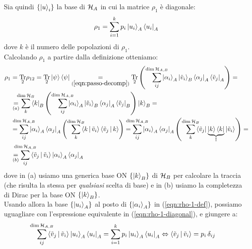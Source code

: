 \documentclass[../../InformazioneQuantistica.tex]{subfiles}
\begin{document}
Sia quindi $\{\Ket{u}_i\}$ la base di $\mathcal{H}_A$ in cui la matrice $\rho_1$ è diagonale:
\begin{align}
\rho_1 = \sum_{i=1}^{k} p_i\Ket{u_i}_A \Bra{u_i}_A
\label{eqn:rho-1-diagonal}
\end{align}
dove $k$ è il numero delle popolazioni di $\rho_1$.\\
Calcolando $\rho_1$ a partire dalla definizione otteniamo:
\begin{align} \nonumber
\rho_1 &= \underset{2}{\op{Tr}}\rho_{12} =\underset{2}{\op{Tr}}\ket{\psi}\bra{\psi} \underset{(\ref{eqn:passo-decomp})}{=} \underset{2}{\op{Tr}} \left(\smashoperator[r]{\sum_{ij}^{\op{dim}\hs_{A,B}}}\ket{\alpha_i}_A\ket{\tilde{v}_i}_B \bra{\alpha_j}_A\bra{\tilde{v}_j}_A \right) =\\ \nonumber
&\underset{(a)}{=} \smashoperator{\sum_k^{\op{dim}\hs_B}} \bra{k}_B \left( \smashoperator[r]{\sum_{ij}^{\op{dim}\hs_{A,B}}} \ket{\alpha_i}_A\ket{\tilde{v}_i}_B \bra{\alpha_j}_A \bra{\tilde{v}_j}_B \right)\ket{k}_B =\\
&= \nonumber \smashoperator{\sum_{ij}^{\op{dim}\hs_{A,B}}} \ket{\alpha_i}_A\bra{\alpha_j}_A \left(\smashoperator[r]{\sum_k^{\op{dim}\hs_B}} \braket{k|\tilde{v}_i} \braket{\tilde{v}_j|k}\right) =
 \smashoperator{\sum_{ij}^{\op{dim}\hs_{A,B}}} \ket{\alpha_i}_A\bra{\alpha_j}_A \left(\smashoperator[r]{\sum_k^{\op{dim}\hs_B}} \bra{\tilde{v}_j}\underbrace{\ket{k}\bra{k}}_{\bb{I}}\ket{\tilde{v}_i}\right) =\\
&\underset{(b)}{=} \smashoperator{\sum_{ij}^{\op{dim}\hs_{A,B}}} \braket{\tilde{v}_j|\tilde{v}_i} \ket{\alpha_i}_A \bra{\alpha_j}_A
\label{eqn:rho-1-def}
\end{align}
dove in (a) usiamo una generica base ON $\{\Ket{k}_B\}$ di $\mathcal{H}_B$ per calcolare la traccia (che risulta la stessa per \textit{qualsiasi} scelta di base) e in (b) usiamo la completezza di Dirac per la base ON $\{\Ket{k}_B\}$.\\
Usando allora la base $\{\Ket{u_i}_A\}$ al posto di $\{\Ket{\alpha_i}_A\}$ in (\ref{eqn:rho-1-def}), possiamo uguagliare con l'espressione equivalente in (\ref{eqn:rho-1-diagonal}), e giungere a:
\begin{align*}
\smashoperator{\sum_{ij}^{\op{dim}\hs_{A,B}}} \braket{\tilde{v}_j|\tilde{v}_i}\ket{u_i}_A \bra{u_i}_A = \sum_{i=1}^k p_i \ket{u_i}_A \bra{u_i}_A \Leftrightarrow \braket{\tilde{v}_j|\tilde{v}_i}=p_i\,\delta_{ij}
\end{align*}

\begin{comment}
\begin{align}
\ket{\psi}=\sum_{i, \alpha} c_{i\alpha}\ket{i}_A\ket{\alpha}_B = \sum_{i} \ket{i}_A \left(\sum_\alpha c_{i\alpha} \ket{\alpha}_B \right)\underset{(a)}{=} \sum_{i}\ket{i}_A \ket{\tilde{i}}_B
\label{eqn:psi-i-j}
\end{align}
\end{comment}
\end{document}
